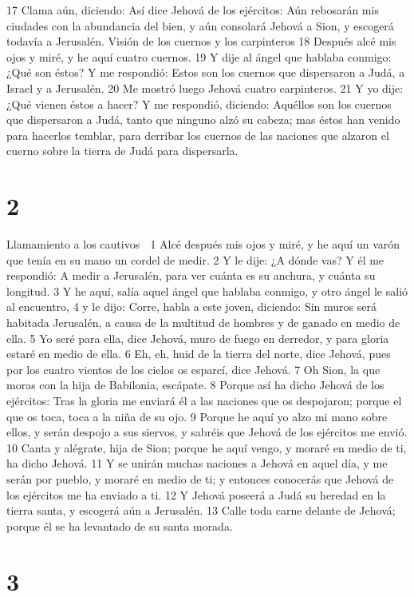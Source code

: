17 Clama aún, diciendo: Así dice Jehová de los ejércitos: Aún rebosarán mis ciudades con la abundancia del bien, y aún consolará Jehová a Sion, y escogerá todavía a Jerusalén.
Visión de los cuernos y los carpinteros
18 Después alcé mis ojos y miré, y he aquí cuatro cuernos.
19 Y dije al ángel que hablaba conmigo: ¿Qué son éstos? Y me respondió: Estos son los cuernos que dispersaron a Judá, a Israel y a Jerusalén.
20 Me mostró luego Jehová cuatro carpinteros.
21 Y yo dije: ¿Qué vienen éstos a hacer? Y me respondió, diciendo: Aquéllos son los cuernos que dispersaron a Judá, tanto que ninguno alzó su cabeza; mas éstos han venido para hacerlos temblar, para derribar los cuernos de las naciones que alzaron el cuerno sobre la tierra de Judá para dispersarla.

\chapter{2}

Llamamiento a los cautivos

1 Alcé después mis ojos y miré, y he aquí un varón que tenía en su mano un cordel de medir.
2 Y le dije: ¿A dónde vas? Y él me respondió: A medir a Jerusalén, para ver cuánta es su anchura, y cuánta su longitud.
3 Y he aquí, salía aquel ángel que hablaba conmigo, y otro ángel le salió al encuentro,
4 y le dijo: Corre, habla a este joven, diciendo: Sin muros será habitada Jerusalén, a causa de la multitud de hombres y de ganado en medio de ella.
5 Yo seré para ella, dice Jehová, muro de fuego en derredor, y para gloria estaré en medio de ella.
6 Eh, eh, huid de la tierra del norte, dice Jehová, pues por los cuatro vientos de los cielos os esparcí, dice Jehová.
7 Oh Sion, la que moras con la hija de Babilonia, escápate.
8 Porque así ha dicho Jehová de los ejércitos: Tras la gloria me enviará él a las naciones que os despojaron; porque el que os toca, toca a la niña de su ojo.
9 Porque he aquí yo alzo mi mano sobre ellos, y serán despojo a sus siervos, y sabréis que Jehová de los ejércitos me envió.
10 Canta y alégrate, hija de Sion; porque he aquí vengo, y moraré en medio de ti, ha dicho Jehová.
11 Y se unirán muchas naciones a Jehová en aquel día, y me serán por pueblo, y moraré en medio de ti; y entonces conocerás que Jehová de los ejércitos me ha enviado a ti.
12 Y Jehová poseerá a Judá su heredad en la tierra santa, y escogerá aún a Jerusalén.
13 Calle toda carne delante de Jehová; porque él se ha levantado de su santa morada.

\chapter{3}

